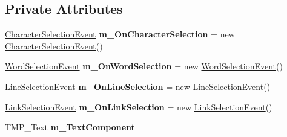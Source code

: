 \subsection*{Private Attributes}
\begin{DoxyCompactItemize}
\item 
\mbox{\label{class_t_m_pro_1_1_t_m_p___text_event_handler_a3fc9193fa2b29ed97e73e037e1e29f1f}} 
\hyperlink{class_t_m_pro_1_1_t_m_p___text_event_handler_1_1_character_selection_event}{Character\+Selection\+Event} {\bfseries m\+\_\+\+On\+Character\+Selection} = new \hyperlink{class_t_m_pro_1_1_t_m_p___text_event_handler_1_1_character_selection_event}{Character\+Selection\+Event}()
\item 
\mbox{\label{class_t_m_pro_1_1_t_m_p___text_event_handler_a6bab88c9b98153f85805838fab7c6af4}} 
\hyperlink{class_t_m_pro_1_1_t_m_p___text_event_handler_1_1_word_selection_event}{Word\+Selection\+Event} {\bfseries m\+\_\+\+On\+Word\+Selection} = new \hyperlink{class_t_m_pro_1_1_t_m_p___text_event_handler_1_1_word_selection_event}{Word\+Selection\+Event}()
\item 
\mbox{\label{class_t_m_pro_1_1_t_m_p___text_event_handler_a0f1219e2cd6672584efe3240d1d1dd0b}} 
\hyperlink{class_t_m_pro_1_1_t_m_p___text_event_handler_1_1_line_selection_event}{Line\+Selection\+Event} {\bfseries m\+\_\+\+On\+Line\+Selection} = new \hyperlink{class_t_m_pro_1_1_t_m_p___text_event_handler_1_1_line_selection_event}{Line\+Selection\+Event}()
\item 
\mbox{\label{class_t_m_pro_1_1_t_m_p___text_event_handler_a5c09f4c9ee868e4dede77967cdff2899}} 
\hyperlink{class_t_m_pro_1_1_t_m_p___text_event_handler_1_1_link_selection_event}{Link\+Selection\+Event} {\bfseries m\+\_\+\+On\+Link\+Selection} = new \hyperlink{class_t_m_pro_1_1_t_m_p___text_event_handler_1_1_link_selection_event}{Link\+Selection\+Event}()
\item 
\mbox{\label{class_t_m_pro_1_1_t_m_p___text_event_handler_ab1182de0a6ced87206e1260b4e1d1515}} 
T\+M\+P\+\_\+\+Text {\bfseries m\+\_\+\+Text\+Component}
\item 

\end{DoxyCompactItemize}
